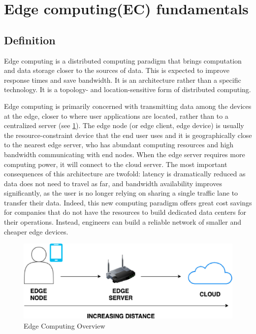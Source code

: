 \section{Edge computing(EC) fundamentals} \label{4ecomfun}

\subsection{Definition}
Edge computing is a distributed computing paradigm that brings computation and data storage closer to the sources of data. This is expected to improve response times and save bandwidth. It is an architecture rather than a specific technology. It is a topology- and location-sensitive form of distributed computing.

Edge computing is primarily concerned with transmitting data among the devices at the edge, closer to where user applications are located, rather than to a centralized server (see \ref{fig:ec_fundamentals}). The edge node (or edge client, edge device) is usually the resource-constraint device that the end user uses and it is geographically close to the nearest edge server, who has abundant computing resources and high bandwidth communicating with end nodes. When the edge server requires more computing power, it will connect to the cloud server. The most important consequences of this architecture are twofold: latency is dramatically reduced as data does not need to travel as far, and bandwidth availability improves significantly, as the user is no longer relying on sharing a single traffic lane to transfer their data. Indeed, this new computing paradigm offers great cost savings for companies that do not have the resources to build dedicated data centers for their operations. Instead, engineers can build a reliable network of smaller and cheaper edge devices. \cite{fedrated_learning_as_edge_computing}


\begin{figure}[H]
\centering
\includegraphics[scale=0.6]{img/edge_computing_main_pic.jpg}
\caption{Edge Computing Overview}
\label{fig:ec_fundamentals}
\end{figure}


